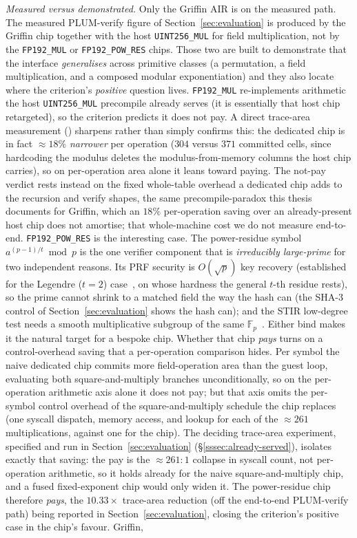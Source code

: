 \emph{Measured versus demonstrated.} Only the Griffin AIR is on the measured path. The measured PLUM-verify figure of Section~\ref{sec:evaluation} is produced by the Griffin chip together with the host \texttt{UINT256\_MUL} for field multiplication, not by the \texttt{FP192\_MUL} or \texttt{FP192\_POW\_RES} chips. Those two are built to demonstrate that the interface \emph{generalises} across primitive classes (a permutation, a field multiplication, and a composed modular exponentiation) and they also locate where the criterion's \emph{positive} question lives. \texttt{FP192\_MUL} re-implements arithmetic the host \texttt{UINT256\_MUL} precompile already serves (it is essentially that host chip retargeted), so the criterion predicts it does not pay. A direct trace-area measurement () sharpens rather than simply confirms this: the dedicated chip is in fact ${\approx}18\%$ \emph{narrower} per operation ($304$ versus $371$ committed cells, since hardcoding the modulus deletes the modulus-from-memory columns the host chip carries), so on per-operation area alone it leans toward paying. The not-pay verdict rests instead on the fixed whole-table overhead a dedicated chip adds to the recursion and verify shapes, the same precompile-paradox this thesis documents for Griffin, which an $18\%$ per-operation saving over an already-present host chip does not amortise; that whole-machine cost we do not measure end-to-end. \texttt{FP192\_POW\_RES} is the interesting case. The power-residue symbol $a^{(p-1)/t}\bmod p$ is the one verifier component that is \emph{irreducibly large-prime} for two independent reasons. Its PRF security is $O(\sqrt p)$ key recovery (established for the Legendre ($t{=}2$) case~\cite{khovratovich2019legendre,may2022legendre}, on whose hardness the general $t$-th residue rests), so the prime cannot shrink to a matched field the way the hash can (the SHA-3 control of Section~\ref{sec:evaluation} shows the hash can); and the STIR low-degree test needs a smooth multiplicative subgroup of the same $\mathbb{F}_p$~\cite{cryptoeprint:2024/390}. Either bind makes it the natural target for a bespoke chip. Whether that chip \emph{pays} turns on a control-overhead saving that a per-operation comparison hides. Per symbol the naive dedicated chip commits more field-operation area than the guest loop, evaluating both square-and-multiply branches unconditionally, so on the per-operation arithmetic axis alone it does not pay; but that axis omits the per-symbol control overhead of the square-and-multiply schedule the chip replaces (one syscall dispatch, memory access, and lookup for each of the ${\approx}261$ multiplications, against one for the chip). The deciding trace-area experiment, specified and run in Section~\ref{sec:evaluation} (\S\ref{sssec:already-served}), isolates exactly that saving: the pay is the ${\approx}261{:}1$ collapse in syscall count, not per-operation arithmetic, so it holds already for the naive square-and-multiply chip, and a fused fixed-exponent chip would only widen it. The power-residue chip therefore \emph{pays}, the $10.33\times$ trace-area reduction (off the end-to-end PLUM-verify path) being reported in Section~\ref{sec:evaluation}, closing the criterion's positive case in the chip's favour. Griffin, 